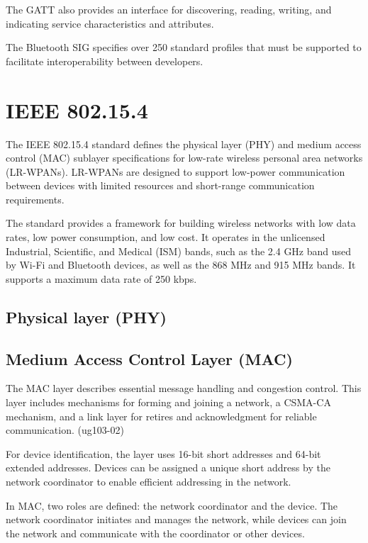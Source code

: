 The GATT also provides an interface for discovering, reading, writing, and indicating service characteristics and attributes.

The Bluetooth SIG specifies over 250 standard profiles that must be supported to facilitate interoperability between developers. \cite{gatt_sup}

\section{IEEE 802.15.4}
\label{sec:15_4}

The IEEE 802.15.4 standard defines the physical layer (PHY) and medium access control (MAC)
sublayer specifications for low-rate wireless personal area networks (LR-WPANs). \cite{kozlowski:2017}
LR-WPANs are designed to support low-power communication between devices
with limited resources and short-range communication requirements.

The standard provides a framework for building wireless networks with low data rates, low power consumption, and low cost.
It operates in the unlicensed Industrial, Scientific, and Medical (ISM) bands, such as the 2.4 GHz band used by Wi-Fi
and Bluetooth devices, as well as the 868 MHz and 915 MHz bands.
It supports a maximum data rate of 250 kbps.

\subsection{Physical layer (PHY)}

\subsection{Medium Access Control Layer (MAC)}
The MAC layer describes essential message handling and congestion control.
This layer includes mechanisms for forming and joining a network, a CSMA-CA mechanism,
and a link layer for retires and acknowledgment for reliable communication. (ug103-02)

For device identification, the layer uses 16-bit short addresses and 64-bit extended addresses.
Devices can be assigned a unique short address by the network coordinator to enable efficient addressing in the network.

In MAC, two roles are defined: the network coordinator and the device.
The network coordinator initiates and manages the network, while devices can join the network
and communicate with the coordinator or other devices.


